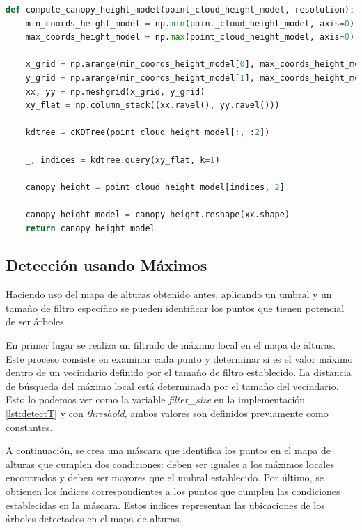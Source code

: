 \vspace{0.2cm}
\begin{lstlisting}[language=Python, caption={Código para obtener el mapa de alturas del dosel}]
def compute_canopy_height_model(point_cloud_height_model, resolution):
    min_coords_height_model = np.min(point_cloud_height_model, axis=0)
    max_coords_height_model = np.max(point_cloud_height_model, axis=0)

    x_grid = np.arange(min_coords_height_model[0], max_coords_height_model[0], resolution)
    y_grid = np.arange(min_coords_height_model[1], max_coords_height_model[1], resolution)
    xx, yy = np.meshgrid(x_grid, y_grid)
    xy_flat = np.column_stack((xx.ravel(), yy.ravel()))

    kdtree = cKDTree(point_cloud_height_model[:, :2])

    _, indices = kdtree.query(xy_flat, k=1)

    canopy_height = point_cloud_height_model[indices, 2]

    canopy_height_model = canopy_height.reshape(xx.shape)
    return canopy_height_model
\end{lstlisting}


\subsection{Detección usando Máximos}

Haciendo uso del mapa de alturas obtenido antes, aplicando un umbral y un tamaño de filtro específico se pueden identificar los puntos que tienen potencial de ser árboles.

En primer lugar se realiza un filtrado de máximo local en el mapa de alturas. Este proceso consiste en examinar cada punto y determinar si es el valor máximo dentro de un vecindario definido por el tamaño de filtro establecido. La distancia de búsqueda del máximo local está determinada por el tamaño del vecindario. Esto lo podemos ver como la variable \textit{filter\_size} en la implementación \ref{lst:detectT} y con \textit{threshold}, ambos valores son definidos previamente como constantes.

A continuación, se crea una máscara que identifica los puntos en el mapa de alturas que cumplen dos condiciones: deben ser iguales a los máximos locales encontrados y deben ser mayores que el umbral establecido. 
Por último, se obtienen los índices correspondientes a los puntos que cumplen las condiciones establecidas en la máscara. Estos índices representan las ubicaciones de los árboles detectados en el mapa de alturas.

